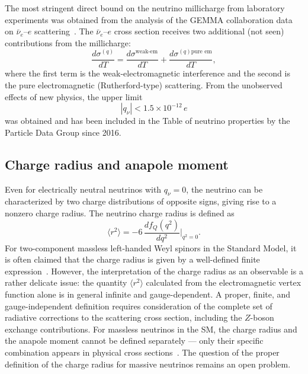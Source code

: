 \documentclass[a4paper,11pt]{article}
\begin{document}
The most stringent direct bound on the neutrino millicharge from laboratory experiments was obtained from the analysis of the GEMMA collaboration data on $\bar{\nu}_e$--$e$ scattering~\cite{Studenikin:2014EPL}. The $\bar{\nu}_e$--$e$ cross section receives two additional (not seen) contributions from the millicharge:
\begin{equation}
\frac{d\sigma^{(q)}}{dT} = \frac{d\sigma^{\text{weak-em}}}{dT} + \frac{d\sigma^{(q)\text{pure em}}}{dT},
\end{equation}
where the first term is the weak-electromagnetic interference and the second is the pure electromagnetic (Rutherford-type) scattering. From the unobserved effects of new physics, the upper limit~\cite{Studenikin:2014EPL}
\begin{equation}
|q_\nu| < 1.5 \times 10^{-12}\,e
\end{equation}
was obtained and has been included in the Table of neutrino properties by the Particle Data Group since 2016.

\subsection{Charge radius and anapole moment}

Even for electrically neutral neutrinos with $q_\nu = 0$, the neutrino can be characterized by two charge distributions of opposite signs, giving rise to a nonzero charge radius. The neutrino charge radius is defined as
\begin{equation}
\langle r^2 \rangle = -6\,\frac{df_Q(q^2)}{dq^2}\bigg|_{q^2=0}.
\end{equation}
For two-component massless left-handed Weyl spinors in the Standard Model, it is often claimed that the charge radius is given by a well-defined finite expression~\cite{Giunti:2015RMP}. However, the interpretation of the charge radius as an observable is a rather delicate issue: the quantity $\langle r^2 \rangle$ calculated from the electromagnetic vertex function alone is in general infinite and gauge-dependent. A proper, finite, and gauge-independent definition requires consideration of the complete set of radiative corrections to the scattering cross section, including the $Z$-boson exchange contributions. For massless neutrinos in the SM, the charge radius and the anapole moment cannot be defined separately --- only their specific combination appears in physical cross sections~\cite{Giunti:2015RMP}. The question of the proper definition of the charge radius for massive neutrinos remains an open problem.
\end{document}
